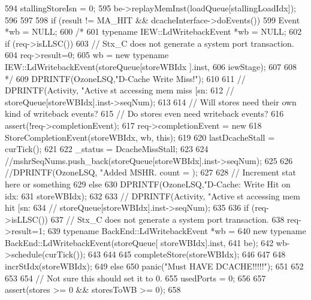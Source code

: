 \begin{DoxyCode}
{{{{594                 stallingStoreIsn = 0;
595                 be->replayMemInst(loadQueue[stallingLoadIdx]);
596             }
597 
598             if (result != MA_HIT && dcacheInterface->doEvents()) {
599                 Event *wb = NULL;
600 /*
601                 typename IEW::LdWritebackEvent *wb = NULL;
602                 if (req->isLLSC()) {
603                     // Stx_C does not generate a system port transaction.
604                     req->result=0;
605                     wb = new typename IEW::LdWritebackEvent(storeQueue[storeWBIdx
      ].inst,
606                                                             iewStage);
607                 }
608 */
609                 DPRINTF(OzoneLSQ,"D-Cache Write Miss!\n");
610 
611 //                DPRINTF(Activity, "Active st accessing mem miss [sn:%
612 //                        storeQueue[storeWBIdx].inst->seqNum);
613 
614                 // Will stores need their own kind of writeback events?
615                 // Do stores even need writeback events?
616                 assert(!req->completionEvent);
617                 req->completionEvent = new
618                     StoreCompletionEvent(storeWBIdx, wb, this);
619 
620                 lastDcacheStall = curTick();
621 
622                 _status = DcacheMissStall;
623 
624                 //mshrSeqNums.push_back(storeQueue[storeWBIdx].inst->seqNum);
625 
626                 //DPRINTF(OzoneLSQ, "Added MSHR. count = %
      );
627 
628                 // Increment stat here or something
629             } else {
630                 DPRINTF(OzoneLSQ,"D-Cache: Write Hit on idx:%
631                         storeWBIdx);
632 
633 //                DPRINTF(Activity, "Active st accessing mem hit [sn:%
634 //                        storeQueue[storeWBIdx].inst->seqNum);
635 
636                 if (req->isLLSC()) {
637                     // Stx_C does not generate a system port transaction.
638                     req->result=1;
639                     typename BackEnd::LdWritebackEvent *wb =
640                         new typename BackEnd::LdWritebackEvent(storeQueue[
      storeWBIdx].inst,
641                                                                be);
642                     wb->schedule(curTick());
643                 }
644 
645                 completeStore(storeWBIdx);
646             }
647 
648             incrStIdx(storeWBIdx);
649         } else {
650             panic("Must HAVE DCACHE!!!!!\n");
651         }
652     }
653 
654     // Not sure this should set it to 0.
655     usedPorts = 0;
656 
657     assert(stores >= 0 && storesToWB >= 0);
658 }
\end{DoxyCode}


